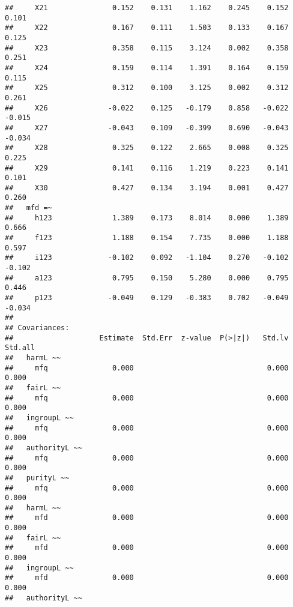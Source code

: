 \documentclass[english,man]{apa6}
\newcounter{author}
\theoremstyle{definition}
\theoremstyle{definition}
\theoremstyle{definition}
\theoremstyle{remark}
\begin{document}
\begin{verbatim}
##     X21               0.152    0.131    1.162    0.245    0.152    0.101
##     X22               0.167    0.111    1.503    0.133    0.167    0.125
##     X23               0.358    0.115    3.124    0.002    0.358    0.251
##     X24               0.159    0.114    1.391    0.164    0.159    0.115
##     X25               0.312    0.100    3.125    0.002    0.312    0.261
##     X26              -0.022    0.125   -0.179    0.858   -0.022   -0.015
##     X27              -0.043    0.109   -0.399    0.690   -0.043   -0.034
##     X28               0.325    0.122    2.665    0.008    0.325    0.225
##     X29               0.141    0.116    1.219    0.223    0.141    0.101
##     X30               0.427    0.134    3.194    0.001    0.427    0.260
##   mfd =~                                                                
##     h123              1.389    0.173    8.014    0.000    1.389    0.666
##     f123              1.188    0.154    7.735    0.000    1.188    0.597
##     i123             -0.102    0.092   -1.104    0.270   -0.102   -0.102
##     a123              0.795    0.150    5.280    0.000    0.795    0.446
##     p123             -0.049    0.129   -0.383    0.702   -0.049   -0.034
## 
## Covariances:
##                    Estimate  Std.Err  z-value  P(>|z|)   Std.lv  Std.all
##   harmL ~~                                                              
##     mfq               0.000                               0.000    0.000
##   fairL ~~                                                              
##     mfq               0.000                               0.000    0.000
##   ingroupL ~~                                                           
##     mfq               0.000                               0.000    0.000
##   authorityL ~~                                                         
##     mfq               0.000                               0.000    0.000
##   purityL ~~                                                            
##     mfq               0.000                               0.000    0.000
##   harmL ~~                                                              
##     mfd               0.000                               0.000    0.000
##   fairL ~~                                                              
##     mfd               0.000                               0.000    0.000
##   ingroupL ~~                                                           
##     mfd               0.000                               0.000    0.000
##   authorityL ~~                                                         

\end{verbatim}
\end{document}
